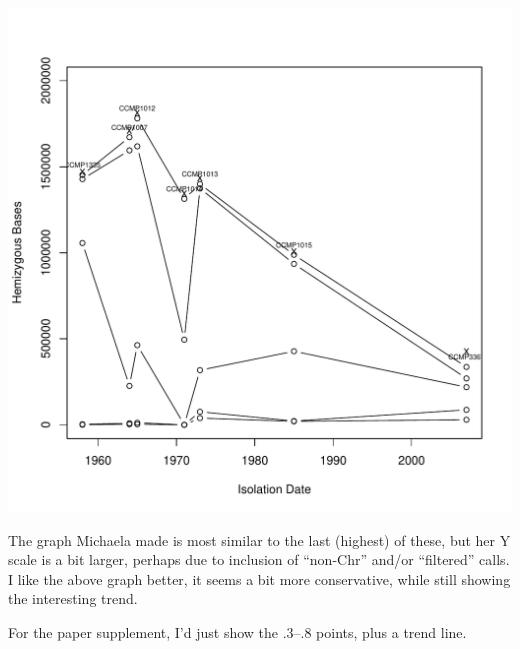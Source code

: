\documentclass{article}\usepackage[]{graphicx}\usepackage[]{color}
\makeatletter
\def\maxwidth{ %
  \ifdim\Gin@nat@width>\linewidth
    \linewidth
  \else
    \Gin@nat@width
  \fi
}
\newenvironment{knitrout}{}{} %
\makeatother
\begin{document}
\begin{knitrout}
{\centering \includegraphics[width=\maxwidth]{figs-knitr/unnamed-chunk-14-1} 

}



\end{knitrout}

The graph Michaela made is most similar to the last (highest) of these, but her Y scale is a bit larger, perhaps due to inclusion of ``non-Chr'' and/or ``filtered'' calls.  I like the above graph better, it seems a bit more conservative, while still showing the interesting trend.

For the paper supplement, I'd just show the .3--.8 points, plus a trend line.
\end{document}
